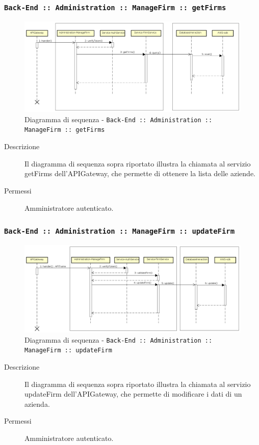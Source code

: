 \documentclass[../DefinizioneDiProdotto_v3.0.0.tex]{subfiles}
\begin{document}
\newpage
\subsubsection{\texttt{Back-End :: Administration :: ManageFirm :: getFirms}}
\begin{figure}[!h]
	\centering
	\includegraphics[width=\textwidth]{DiagrammiSequenza/Back-End/manageFirm/getFirms.png}
	\caption{Diagramma di sequenza - \texttt{Back-End :: Administration :: ManageFirm :: getFirms }}
\end{figure}
\begin{description}
	\item [Descrizione] Il diagramma di sequenza sopra riportato illustra la chiamata al servizio getFirms dell'APIGateway, che permette di ottenere la lista delle aziende.
	\item [Permessi] Amministratore autenticato.
\end{description}

\subsubsection{\texttt{Back-End :: Administration :: ManageFirm :: updateFirm}}
\begin{figure}[!h]
	\centering
	\includegraphics[width=\textwidth]{DiagrammiSequenza/Back-End/manageFirm/updateFirm.png}
	\caption{Diagramma di sequenza - \texttt{Back-End :: Administration :: ManageFirm :: updateFirm }}
\end{figure}
\begin{description}
	\item [Descrizione] Il diagramma di sequenza sopra riportato illustra la chiamata al servizio updateFirm dell'APIGateway, che permette di modificare i dati di un azienda.
	\item [Permessi] Amministratore autenticato.
\end{description}
\end{document}

